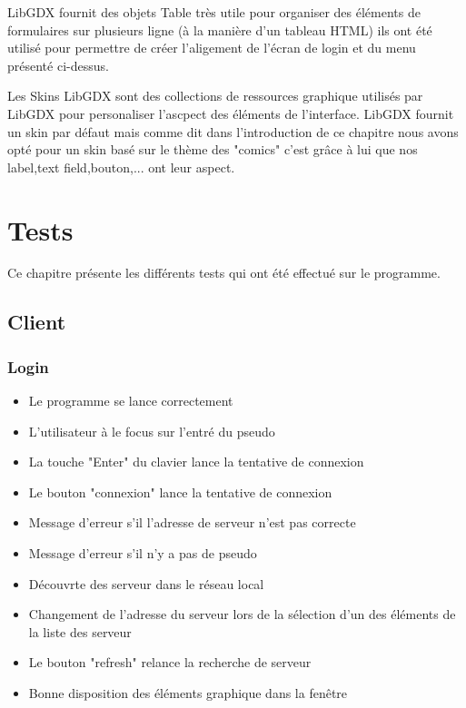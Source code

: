 \documentclass{report}
\begin{document}
LibGDX fournit des objets Table très utile pour organiser des éléments de formulaires sur plusieurs ligne
(à la manière d'un tableau HTML) ils ont été utilisé pour permettre de créer l'aligement de l'écran de login et du menu
présenté ci-dessus.

Les Skins LibGDX sont des collections de ressources graphique utilisés par LibGDX pour personaliser l'ascpect des éléments
de l'interface. LibGDX fournit un skin par défaut mais comme dit dans l'introduction de ce chapitre nous avons opté pour un skin
basé sur le thème des "comics" c'est grâce à lui que nos label,text field,bouton,... ont leur aspect.

\chapter{Tests}
Ce chapitre présente les différents tests qui ont été effectué sur le programme.
\section{Client}
\subsection{Login}
\begin{itemize}
  \item Le programme se lance correctement
  \item L'utilisateur à le focus sur l'entré du pseudo
  \item La touche "Enter" du clavier lance la tentative de connexion
  \item Le bouton "connexion" lance la tentative de connexion
  \item Message d'erreur s'il l'adresse de  serveur n'est pas correcte
  \item Message d'erreur s'il n'y a pas de pseudo
  \item Découvrte des serveur dans le réseau local
  \item Changement de l'adresse du serveur lors de la sélection d'un des éléments de la liste des serveur
  \item Le bouton "refresh" relance la recherche de serveur
  \item Bonne disposition des éléments graphique dans la fenêtre

\end{itemize}
\end{document}
